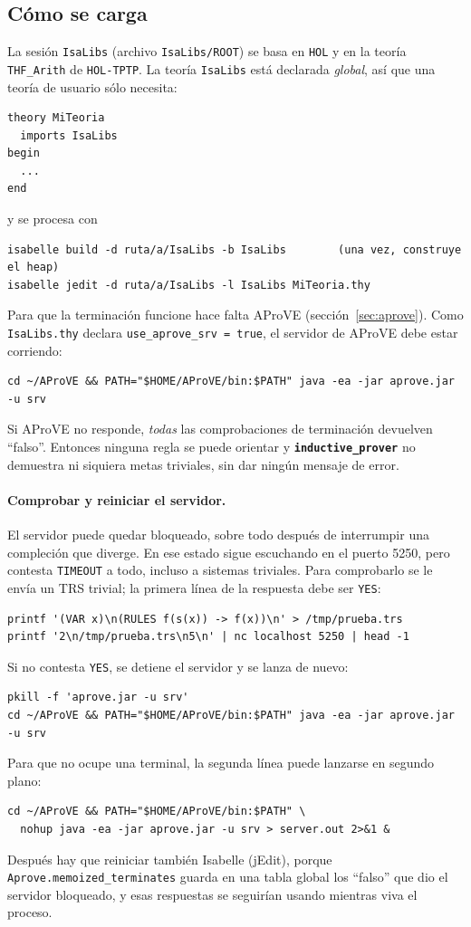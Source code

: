 \documentclass[11pt,a4paper]{article}
\newcommand{\isa}[1]{\texttt{#1}}
\newcommand{\cmd}[1]{\textbf{\texttt{#1}}}
\theoremstyle{definition}
\theoremstyle{remark}
\begin{document}
\subsection{Cómo se carga}
\label{sec:carga}

La sesión \isa{IsaLibs} (archivo \isa{IsaLibs/ROOT}) se basa en \isa{HOL} y en la
teoría \isa{THF\_Arith} de \isa{HOL-TPTP}. La teoría \isa{IsaLibs} está declarada
\emph{global}, así que una teoría de usuario sólo necesita:
\begin{lstlisting}
theory MiTeoria
  imports IsaLibs
begin
  ...
end
\end{lstlisting}
y se procesa con
\begin{lstlisting}[language={}]
isabelle build -d ruta/a/IsaLibs -b IsaLibs        (una vez, construye el heap)
isabelle jedit -d ruta/a/IsaLibs -l IsaLibs MiTeoria.thy
\end{lstlisting}
Para que la terminación funcione hace falta AProVE (sección~\ref{sec:aprove}). Como
\isa{IsaLibs.thy} declara \isa{use\_aprove\_srv = true}, el servidor de AProVE debe
estar corriendo:
\begin{lstlisting}[language={}]
cd ~/AProVE && PATH="$HOME/AProVE/bin:$PATH" java -ea -jar aprove.jar -u srv
\end{lstlisting}
Si AProVE no responde, \emph{todas} las comprobaciones de terminación devuelven
``falso''. Entonces ninguna regla se puede orientar y \cmd{inductive\_prover} no
demuestra ni siquiera metas triviales, sin dar ningún mensaje de error.

\paragraph{Comprobar y reiniciar el servidor.} El servidor puede quedar bloqueado,
sobre todo después de interrumpir una compleción que diverge. En ese estado sigue
escuchando en el puerto 5250, pero contesta \texttt{TIMEOUT} a todo, incluso a
sistemas triviales.
Para comprobarlo se le envía un TRS trivial; la primera línea de la respuesta debe
ser \texttt{YES}:
\begin{lstlisting}[language={}]
printf '(VAR x)\n(RULES f(s(x)) -> f(x))\n' > /tmp/prueba.trs
printf '2\n/tmp/prueba.trs\n5\n' | nc localhost 5250 | head -1
\end{lstlisting}
Si no contesta \texttt{YES}, se detiene el servidor y se lanza de nuevo:
\begin{lstlisting}[language={}]
pkill -f 'aprove.jar -u srv'
cd ~/AProVE && PATH="$HOME/AProVE/bin:$PATH" java -ea -jar aprove.jar -u srv
\end{lstlisting}
Para que no ocupe una terminal, la segunda línea puede lanzarse en segundo plano:
\begin{lstlisting}[language={}]
cd ~/AProVE && PATH="$HOME/AProVE/bin:$PATH" \
  nohup java -ea -jar aprove.jar -u srv > server.out 2>&1 &
\end{lstlisting}
Después hay que reiniciar también Isabelle (jEdit), porque
\isa{Aprove.memoized\_terminates} guarda en una tabla global los ``falso'' que dio
el servidor bloqueado, y esas respuestas se seguirían usando mientras viva el
proceso.
\end{document}
